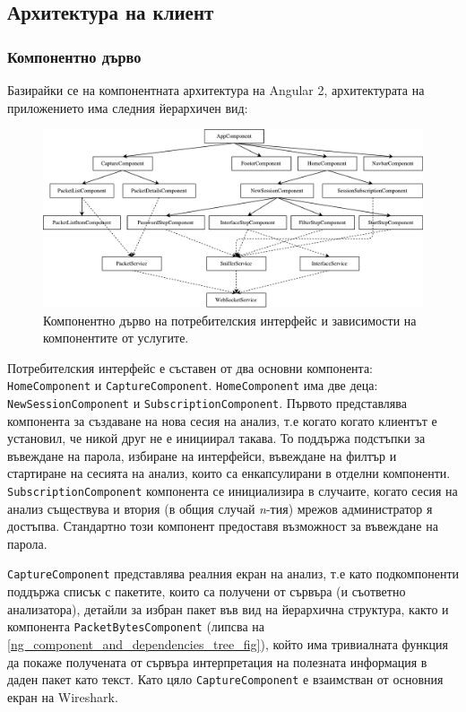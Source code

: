\documentclass[12pt,a4paper,oneside]{book}
\begin{document}
\subsection{Архитектура на клиент}

\subsubsection{Компонентно дърво}

Базирайки се на компонентната архитектура на Angular 2, архитектурата на
приложението има следния йерархичен вид:

\begin{figure}[h!]
  \centering
  \includegraphics[scale=.5]{figures/ng_component_and_dependencies_tree.pdf}
  \caption{Компонентно дърво на потребителския интерфейс и зависимости на
  компонентите от услугите.}
  \label{ng_component_and_dependencies_tree_fig}
\end{figure}

Потребителския интерфейс е съставен от два основни компонента:
\texttt{HomeComponent} и \texttt{CaptureComponent}. \texttt{HomeComponent}
има две деца: \texttt{NewSessionComponent} и \texttt{SubscriptionComponent}.
Първото представлява компонента за създаване на нова сесия на анализ, т.е когато
когато клиентът е установил, че никой друг не е инициирал такава. То поддържа
подстъпки за въвеждане на парола, избиране на интерфейси, въвеждане на филтър и
стартиране на сесията на анализ, които са енкапсулирани в отделни компоненти.
\texttt{SubscriptionComponent} компонента се инициализира в случаите, когато
сесия на анализ съществува и втория (в общия случай \textit{n}-тия) мрежов администратор
я достъпва. Стандартно този компонент предоставя възможност за въвеждане на
парола.

\texttt{CaptureComponent} представлява реалния екран на анализ, т.е като
подкомпоненти поддържа списък с пакетите, които са получени от сървъра (и
съответно анализатора), детайли за избран пакет във вид на йерархична
структура, както и компонента \texttt{PacketBytesComponent} (липсва на
\autoref{ng_component_and_dependencies_tree_fig}), който има
тривиалната функция да покаже получената от сървъра интерпретация на полезната
информация в даден пакет като текст. Като цяло \texttt{CaptureComponent} е
взаимстван от основния екран на Wireshark.
\end{document}
